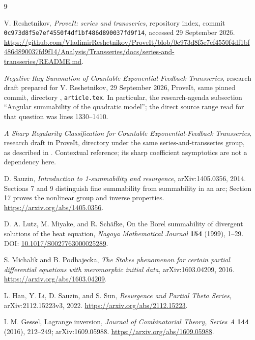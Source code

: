 \documentclass[11pt,a4paper]{article}
\numberwithin{equation}{section}
\theoremstyle{definition}
\theoremstyle{remark}
\begin{document}
\begin{thebibliography}{9}
\raggedright

V. Reshetnikov, \emph{ProveIt: series and transseries}, repository index,
commit \texttt{0c973d8f5e7ef4550f4df1bf486d890037fd9f14}, accessed
29 September 2026.
\url{https://github.com/VladimirReshetnikov/ProveIt/blob/0c973d8f5e7ef4550f4df1bf486d890037fd9f14/Analysis/Transseries/docs/series-and-transseries/README.md}.

\emph{Negative-Ray Summation of Countable Exponential-Feedback Transseries},
research draft prepared for V. Reshetnikov, 29 September 2026,
ProveIt, same pinned commit, directory
,
\texttt{article.tex}.  In particular, the research-agenda subsection
``Angular summability of the quadratic model''; the direct source range
read for that question was lines 1330--1410.

\emph{A Sharp Regularity Classification for Countable Exponential-Feedback
Transseries}, research draft in ProveIt, directory
under the same series-and-transseries group, as described in
\cite{repo-index,repo-negative}.  Contextual reference; its sharp
coefficient asymptotics are not a dependency here.

D. Sauzin, \emph{Introduction to 1-summability and resurgence},
arXiv:1405.0356, 2014.  Sections 7 and 9 distinguish fine summability
from summability in an arc; Section 17 proves the nonlinear group and
inverse properties.
\url{https://arxiv.org/abs/1405.0356}.

D. A. Lutz, M. Miyake, and R. Sch\"afke,
On the Borel summability of divergent solutions of the heat equation,
\emph{Nagoya Mathematical Journal} \textbf{154} (1999), 1--29.
DOI: \href{https://doi.org/10.1017/S0027763000025289}{10.1017/S0027763000025289}.

S. Michalik and B. Podhajecka,
\emph{The Stokes phenomenon for certain partial differential equations
with meromorphic initial data}, arXiv:1603.04209, 2016.
\url{https://arxiv.org/abs/1603.04209}.

L. Han, Y. Li, D. Sauzin, and S. Sun,
\emph{Resurgence and Partial Theta Series}, arXiv:2112.15223v3, 2022.
\url{https://arxiv.org/abs/2112.15223}.

I. M. Gessel, Lagrange inversion,
\emph{Journal of Combinatorial Theory, Series A} \textbf{144} (2016),
212--249; arXiv:1609.05988.
\url{https://arxiv.org/abs/1609.05988}.

\end{thebibliography}
\end{document}
